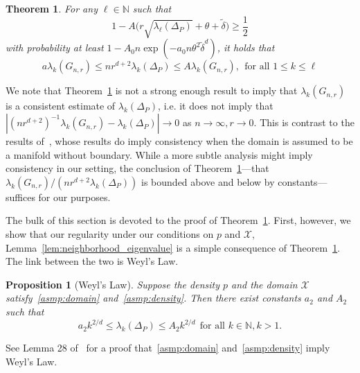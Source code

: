 \documentclass[twoside]{article}
\newcommand{\1}{\mathbf{1}}
\newcommand{\Xset}{\mathcal{X}}
\newcommand{\wt}[1]{\widetilde{#1}}
\newtheorem{theorem}{Theorem}
\newtheorem{proposition}{Proposition}
\theoremstyle{definition}
\theoremstyle{remark}
\begin{document}
\begin{theorem}
	\label{thm:neighborhood_eigenvalue}
	For any $\ell \in \mathbb{N}$ such that
	\begin{equation}
	\label{eqn:neighborhood_eigenvalue_1}
	1 - A\Biggl(r \sqrt{\lambda_{\ell}(\Delta_P)} + \theta + \wt{\delta}\Biggr)\geq \frac{1}{2}
	\end{equation}
	with probability at least $1 - A_0n\exp(-a_0n\theta^2\wt{\delta}^{d})$, it holds that
	\begin{equation}
	\label{eqn:eigenvalue_bound}
	a \lambda_k(G_{n,r}) \leq nr^{d+2} \lambda_k(\Delta_P) \leq A \lambda_k(G_{n,r}),~~\textrm{for all $1 \leq k \leq \ell$}
	\end{equation}
\end{theorem}
We note that Theorem~\ref{thm:neighborhood_eigenvalue} is not a strong enough result to imply that $\lambda_{k}(G_{n,r})$ is a consistent estimate of $\lambda_k(\Delta_P)$, i.e. it does not imply that $|(nr^{d + 2})^{-1}\lambda_{k}(G_{n,r}) - \lambda_k(\Delta_P)| \to 0$ as $n \to \infty, r \to 0$. This is contrast to the results of~\citet{burago2014,trillos2019,calder2019}, whose results do imply consistency when the domain is assumed to be a manifold without boundary. While a more subtle analysis might imply consistency in our setting, the conclusion of Theorem~\ref{thm:neighborhood_eigenvalue}---that $\lambda_k(G_{n,r})/(nr^{d + 2}\lambda_k(\Delta_P))$ is bounded above and below by constants---suffices for our purposes.  

The bulk of this section is devoted to the proof of Theorem~\ref{thm:neighborhood_eigenvalue}. First, however, we show that our regularity under our conditions on $p$ and $\Xset$, Lemma~\ref{lem:neighborhood_eigenvalue} is a simple consequence of Theorem~\ref{thm:neighborhood_eigenvalue}. The link between the two is Weyl's Law.
\begin{proposition}[Weyl's Law]
	\label{prop:weyl}
	Suppose the density $p$ and the domain $\Xset$ satisfy~\ref{asmp:domain} and~\ref{asmp:density}. Then there exist constants $a_2$ and $A_2$ such that
	\begin{equation}
	\label{eqn:weyls_law}
	a_2k^{2/d} \leq \lambda_k(\Delta_P) \leq A_2k^{2/d}~~\textrm{for all $k \in \mathbb{N}, k > 1$}.
	\end{equation}
\end{proposition}
See Lemma 28 of~\citet{dunlop2020} for a proof that~\ref{asmp:domain} and~\ref{asmp:density} imply Weyl's Law.
\end{document}
